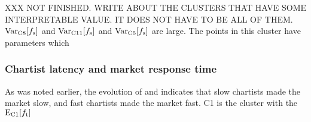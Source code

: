 XXX NOT FINISHED. WRITE ABOUT THE CLUSTERS THAT HAVE SOME INTERPRETABLE VALUE. IT DOES NOT HAVE TO BE ALL OF THEM.
$\mathrm{Var}_\text{C8}[f_\text{s}]$ and $\mathrm{Var}_\text{C11}[f_\text{s}]$ and $\mathrm{Var}_\text{C5}[f_\text{s}]$ are large. The points in this cluster have parameters which 



\subsubsection*{Chartist latency and market response time}
As was noted earlier, the evolution of \sclatencymu{} and \timetoreachnewfundamental{} indicates that slow chartists made the market slow, and fast chartists made the market fast. C1 is the cluster with the $\mathrm{E}_\text{C{1}}[f_\text{t}]$




